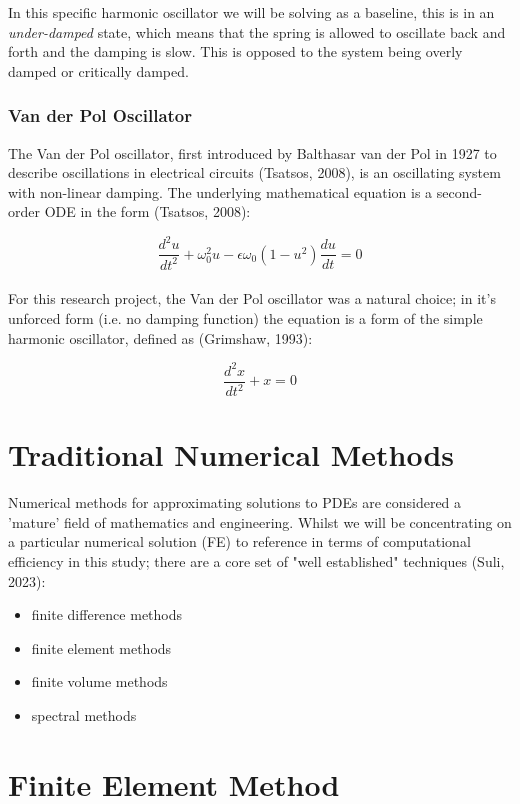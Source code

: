 \documentclass[12pt, openany]{book}
\begin{document}
In this specific harmonic oscillator we will be solving as a baseline, this is in an \textit{under-damped} state, which means that the spring is allowed to oscillate back and forth and the damping is slow. This is opposed to the system being overly damped or critically damped.

\subsubsection{Van der Pol Oscillator}

The Van der Pol oscillator, first introduced by Balthasar van der Pol in 1927 to describe oscillations in electrical circuits (Tsatsos, 2008), is an oscillating system with non-linear damping. The underlying mathematical equation is a second-order ODE in the form (Tsatsos, 2008):

\[\frac{d^2u}{dt^2}+\omega^2_0u-\epsilon\omega_0(1-u^2)\frac{du}{dt}=0\] \\

For this research project, the Van der Pol oscillator was a natural choice; in it's unforced form (i.e. no damping function) the equation is a form of the simple harmonic oscillator, defined as (Grimshaw, 1993):

\[\frac{d^2x}{dt^2}+x=0\]

\section{Traditional Numerical Methods}

Numerical methods for approximating solutions to PDEs are considered a 'mature' field of mathematics and engineering. Whilst we will be concentrating on a particular numerical solution (FE) to reference in terms of computational efficiency in this study; there are a core set of "well established" techniques (Suli, 2023):

\begin{itemize}
    \item finite difference methods
    \item finite element methods
    \item finite volume methods
    \item spectral methods
\end{itemize}

\section{Finite Element Method}
\end{document}
